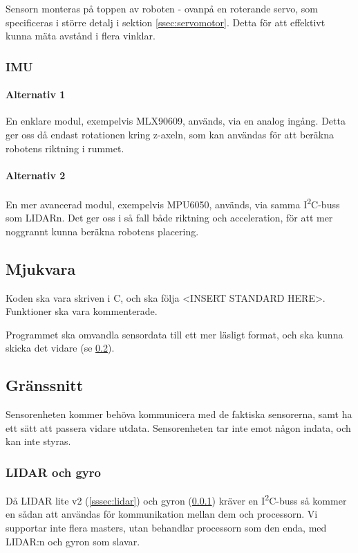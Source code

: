 \documentclass[a4paper,11pt]{article}
\begin{document}
Sensorn monteras på toppen av roboten - ovanpå en roterande servo, som specificeras i större detalj i sektion \ref{ssec:servomotor}. Detta för att effektivt kunna mäta avstånd i flera vinklar.

\subsubsection{IMU} \label{sssec:imu}

\paragraph{Alternativ 1}
En enklare modul, exempelvis MLX90609, används, via en analog ingång. Detta ger oss då endast rotationen kring z-axeln, som kan användas för att beräkna robotens riktning i rummet.

\paragraph{Alternativ 2}
En mer avancerad modul, exempelvis MPU6050, används, via samma I\textsuperscript{2}C-buss som LIDARn. Det ger oss i så fall både riktning och acceleration, för att mer noggrannt kunna beräkna robotens placering. %

\subsection{Mjukvara}

Koden ska vara skriven i C, och ska följa <INSERT STANDARD HERE>. Funktioner ska vara kommenterade.

Programmet ska omvandla sensordata till ett mer läsligt format, och ska kunna skicka det vidare (se \ref{ssec:sensorInterface}).

\subsection{Gränssnitt} \label{ssec:sensorInterface}
Sensorenheten kommer behöva kommunicera med de faktiska sensorerna, samt ha ett sätt att passera vidare utdata. Sensorenheten tar inte emot någon indata, och kan inte styras.

\subsubsection{LIDAR och gyro}
Då LIDAR lite v2 (\ref{sssec:lidar}) och gyron (\ref{sssec:imu}) kräver en I\textsuperscript{2}C-buss så kommer en sådan att användas för kommunikation mellan dem och processorn. Vi supportar inte flera masters, utan behandlar processorn som den enda, med LIDAR:n och gyron som slavar.
\end{document}
